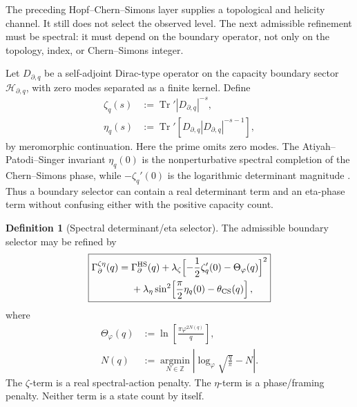 \documentclass[aps,prd,reprint,nofootinbib,superscriptaddress,floatfix]{revtex4-2}
\numberwithin{equation}{section}
\theoremstyle{definition}
\newtheorem{definition}{Definition}[section]
\theoremstyle{plain}
\begin{document}
The preceding Hopf--Chern--Simons layer supplies a topological and
helicity channel.  It still does not select the observed level.  The
next admissible refinement must be spectral: it must depend on the
boundary operator, not only on the topology, index, or Chern--Simons
integer.

Let \(D_{\partial,q}\) be a self-adjoint Dirac-type operator on the
capacity boundary sector \(\mathcal H_{\partial,q}\), with zero modes
separated as a finite kernel.  Define
\begin{align}
\zeta_q(s)&:=\operatorname{Tr}' |D_{\partial,q}|^{-s},\\
\eta_q(s)&:=\operatorname{Tr}'\!\left[
D_{\partial,q}|D_{\partial,q}|^{-s-1}\right],
\end{align}
by meromorphic continuation.  Here the prime omits zero modes.  The
Atiyah--Patodi--Singer invariant \(\eta_q(0)\) is the nonperturbative
spectral completion of the Chern--Simons phase, while
\(-\zeta_q'(0)\) is the logarithmic determinant magnitude
\cite{AtiyahPatodiSinger1975,DaiFreed1994,Witten2019Eta}.  Thus a
boundary selector can contain a real determinant term and an eta-phase
term without confusing either with the positive capacity count.

\begin{definition}[Spectral determinant/eta selector]
The admissible boundary selector may be refined by
\begin{equation}
\boxed{
\begin{aligned}
\Gamma_{\partial}^{\zeta\eta}(q)
={}&\Gamma_{\partial}^{\rm HS}(q)
+\lambda_{\zeta}\Bigl[
-\frac12\zeta_q'(0)-\Theta_\varphi(q)
\Bigr]^2\\
&+\lambda_{\eta}\sin^2\!\left[
\frac{\pi}{2}\eta_q(0)-\theta_{\rm CS}(q)
\right],
\end{aligned}}
\end{equation}
where
\begin{align}
\Theta_\varphi(q)
&:=
\ln\!\left[
\frac{\pi\varphi^{2N(q)}}{q}
\right],\\
N(q)
&:=\operatorname*{argmin}_{N\in\mathbb Z}
\left|
\log_\varphi\sqrt{\frac{q}{\pi}}-N
\right|.
\end{align}
The \(\zeta\)-term is a real spectral-action penalty.  The \(\eta\)-term
is a phase/framing penalty.  Neither term is a state count by itself.
\end{definition}
\end{document}
